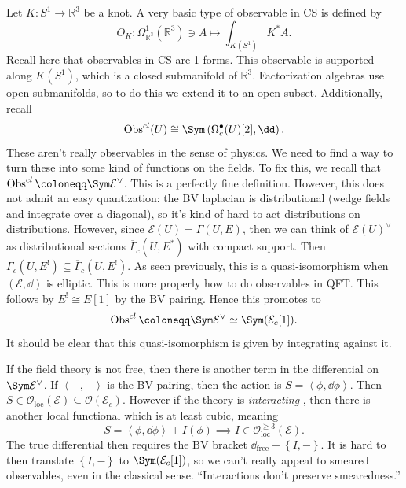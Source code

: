 
Let $K : S^1 \to \mathbb{R} ^3$ be a knot. A very basic type of observable in CS is defined by
\[
	O_K : \Omega ^1_{\mathbb{R} ^3} (\mathbb{R} ^3) \ni A\mapsto \int_{K(S^1)} K^*A
.\]
Recall here that observables in CS are 1-forms. This observable is supported along $K(S^1)$, which is a closed submanifold of $\mathbb{R} ^3$. Factorization algebras use open submanifolds, so to do this we extend it to an open subset. Additionally, recall
\[
	\Obs^{cl} (U) \cong \Sym \left( \Omega ^{\bullet}_c(U)[2],\dd  \right) 
.\]
These aren't really observables in the sense of physics. We need to find a way to turn these into some kind of functions on the fields. To fix this, we recall that $\Obs^{cl} \coloneqq \Sym \mathcal{E} ^\vee $. This is a perfectly fine definition. However, this does not admit an easy quantization: the BV laplacian is distributional (wedge fields and integrate over a diagonal), so it's kind of hard to act distributions on distributions. However, since $\mathcal{E} (U)=\Gamma (U,E)$, then we can think of $\mathcal{E} (U)^\vee $ as distributional sections $\overline{\Gamma }_c(U,E^*)$ with compact support. Then $\Gamma _c(U,E^!) \subseteq \overline{\Gamma }_c(U,E^!)$. As seen previously, this is a quasi-isomorphism when $(\mathcal{E} ,\dd )$ is elliptic. This is more properly how to do observables in QFT. This follows by $E^! \cong E[1]$ by the BV pairing. Hence this promotes to
\[
	\Obs^{cl} \coloneqq \Sym \mathcal{E} ^\vee \simeq \Sym (\mathcal{E} _c[1])
.\]
It should be clear that this quasi-isomorphism is given by integrating against it.

\begin{remark}
	If the field theory is not free, then there is another term in the differential on $\Sym \mathcal{E} ^\vee $. If $\left\langle -,- \right\rangle $ is the BV pairing, then the action is $S=\left\langle \phi ,\dd \phi  \right\rangle $. Then $S\in \mathcal{O} _{\mathrm{loc} } (\mathcal{E} )\subseteq \mathcal{O} (\mathcal{E}_c)$. However if the theory is \emph{interacting} , then there is another local functional which is at least cubic, meaning
	\[
		S=\left\langle \phi ,\dd \phi  \right\rangle +I(\phi ) \implies I\in \mathcal{O} _{\mathrm{loc} }^{\geq 3} (\mathcal{E} )
	.\]
	The true differential then requires the BV bracket $\dd _{\mathrm{free} } +\left\{ I,- \right\} $. It is hard to then translate $\left\{ I,- \right\} $ to $\Sym (\mathcal{E} _c[1])$, so we can't really appeal to smeared observables, even in the classical sense. ``Interactions don't preserve smearedness.''
\end{remark}

